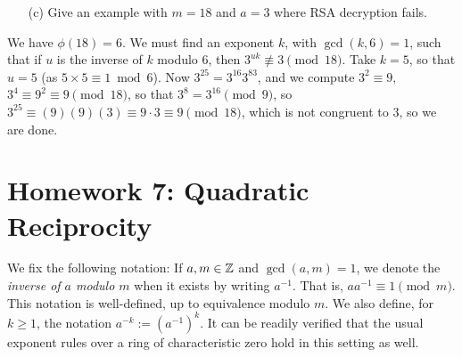 \documentclass{article}
\begin{document}
\begin{exercise}[Chapter 18, \#2]
\begin{itemize}
    \item[(c)] Give an example with $m=18$ and $a=3$ where RSA decryption fails.
\end{itemize}
\begin{solution}
We have $\phi(18) = 6$. We must find an exponent $k$, with $\gcd(k, 6) = 1$, such that if $u$ is the inverse of $k$ modulo $6$, then $3^{uk} \not\equiv 3\pmod{18}$. Take $k=5$, so that $u=5$ (as $5\times 5\equiv 1\bmod 6$). Now $3^{25} = 3^{16}3^83$, and we compute $3^2\equiv 9$, $3^4\equiv 9^2 \equiv 9\pmod{18}$, so that $3^8 = 3^{16}\pmod 9$, so $3^{25} \equiv (9)(9)(3) \equiv 9\cdot 3\equiv 9\pmod{18}$, which is not congruent to $3$, so we are done.
\end{solution}
\end{exercise}

\section*{Homework 7: Quadratic Reciprocity}
We fix the following notation: If $a,m\in \mathbb Z$ and $\gcd(a, m) = 1$, we denote the \textit{inverse of $a$ modulo $m$} when it exists by writing $a^{-1}$. That is, $aa^{-1}\equiv 1\pmod m$. This notation is well-defined, up to equivalence modulo $m$. We also define, for $k\geq 1$, the notation $a^{-k} := (a^{-1})^k$. It can be readily verified that the usual exponent rules over a ring of characteristic zero hold in this setting as well.
\end{document}

